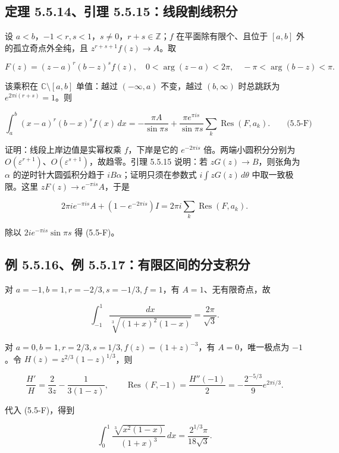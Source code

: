 \documentclass[11pt,a4paper]{article}
\begin{document}
\subsection{定理 5.5.14、引理 5.5.15：线段割线积分}\label{ch05-s5-heading-10}

设 \(a<b\)，\(-1<r,s<1\)，\(s\ne0\)，\(r+s\in\mathbb Z\)；\(f\)
在平面除有限个、且位于 \([a,b]\) 外的孤立奇点外全纯，且
\(z^{r+s+1}f(z)\to A\)。取

\[
F(z)=(z-a)^r(b-z)^sf(z),\quad
0<\arg(z-a)<2\pi,\quad-\pi<\arg(b-z)<\pi.
\]

该乘积在 \(\mathbb C\setminus[a,b]\) 单值：越过 \((-\infty,a)\)
不变，越过 \((b,\infty)\) 时总跳跃为 \(e^{2\pi i(r+s)}=1\)。则

\[
\int_a^b(x-a)^r(b-x)^sf(x)\,dx
=-\frac{\pi A}{\sin\pi s}
+\frac{\pi e^{\pi is}}{\sin\pi s}\sum_k\operatorname{Res}(F,a_k).
\qquad\text{(5.5-F)}
\]

证明：线段上岸边值是实幂权乘 \(f\)，下岸是它的 \(e^{-2\pi is}\)
倍。两端小圆积分分别为
\(O(\varepsilon^{r+1})\)、\(O(\varepsilon^{s+1})\)，故趋零。引理 5.5.15
说明：若 \(zG(z)\to B\)，则张角为 \(\alpha\) 的逆时针大圆弧积分趋于
\(iB\alpha\)；证明只须在参数式 \(i\int zG(z)\,d\theta\)
中取一致极限。这里 \(zF(z)\to e^{-\pi is}A\)，于是

\[
2\pi i e^{-\pi is}A+(1-e^{-2\pi is})I
=2\pi i\sum_k\operatorname{Res}(F,a_k).
\]

除以 \(2ie^{-\pi is}\sin\pi s\) 得 (5.5-F)。

\subsection{例 5.5.16、例 5.5.17：有限区间的分支积分}\label{ch05-s5-heading-11}

对 \(a=-1,b=1,r=-2/3,s=-1/3,f=1\)，有 \(A=1\)、无有限奇点，故

\[
\int_{-1}^1\frac{dx}{\sqrt[3]{(1+x)^2(1-x)}}=\frac{2\pi}{\sqrt3}.
\]

对 \(a=0,b=1,r=2/3,s=1/3,f(z)=(1+z)^{-3}\)，有 \(A=0\)，唯一极点为
\(-1\)。令 \(H(z)=z^{2/3}(1-z)^{1/3}\)，则

\[
\frac{H'}H=\frac2{3z}-\frac1{3(1-z)},\qquad
\operatorname{Res}(F,-1)=\frac{H''(-1)}2
=-\frac{2^{-5/3}}9e^{2\pi i/3}.
\]

代入 (5.5-F)，得到

\[
\int_0^1\frac{\sqrt[3]{x^2(1-x)}}{(1+x)^3}\,dx
=\frac{2^{1/3}\pi}{18\sqrt3}.
\]

\end{document}
